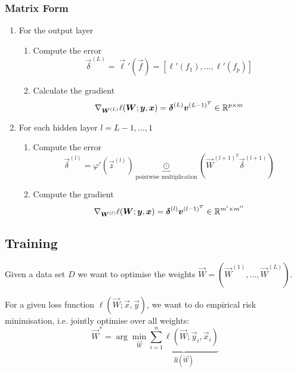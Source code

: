 \subsubsection{Matrix Form}
\begin{enumerate}
	\item For the output layer
	\begin{enumerate}
		\item Compute the error
		\begin{equation*}
		\vec{\delta}^{(L)}
		= \vec{\ell}'(\vec{f})
		= [\ell'(f_1), \dotsc, \ell'(f_p)]
		\end{equation*}
		\item Calculate the gradient
		\begin{equation*}
		\nabla_{\boldsymbol{W}^{(L)}} \ell(\boldsymbol{W}; \boldsymbol{y}, \boldsymbol{x})
		= \boldsymbol{\delta}^{(L)} \boldsymbol{v}^{(L-1)^T}
		\in \mathbb{R}^{p \times m}
		\end{equation*}
	\end{enumerate}
	
	\item For each hidden layer $l = L - 1, \dotsc, 1$
	\begin{enumerate}
		\item Compute the error
		\begin{equation*}
		\vec{\delta}^{(l)}
		= \varphi'(\vec{z}^{(l)}) \underbrace{\odot}_{\text{pointwise multiplication}} 
		(\vec{W}^{(l + 1)^T} \vec{\delta}^{(l + 1)})
		\end{equation*}
		\item Compute the gradient
		\begin{equation*}
		\nabla_{\boldsymbol{W}^{(l)}} \ell(\boldsymbol{W}; \boldsymbol{y}, \boldsymbol{x})
		= \boldsymbol{\delta}^{(l)} \boldsymbol{v}^{(l-1)^T}
		\in \mathbb{R}^{m' \times m''}
		\end{equation*}
	\end{enumerate}
\end{enumerate}


\subsection{Training}
Given a data set $D$ we want to optimise the weights
$\vec{W} = (\vec{W}^{(1)}, \dotsc, \vec{W}^{(L)})$.

For a given loss function $\ell(\vec{W}; \vec{x}, \vec{y})$,
we want to do empirical risk minimisation,
i.e. jointly optimise over all weights:
\begin{equation*}
\vec{W}^*
= \arg\min_{\vec{W}}{
	\underbrace{
		\sum_{i=1}^n{\ell(\vec{W}; \vec{y}_i, \vec{x}_i)}
	}_{\hat{R}(\vec{W})}
}
\end{equation*}

